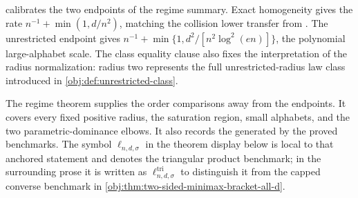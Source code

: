 \documentclass[11pt]{article}
\begin{document}
 calibrates the two endpoints of the regime summary. Exact homogeneity gives the rate \(n^{-1}+\min(1,d/n^2)\), matching the collision lower transfer from \citet{ZengBalakrishnanHanKennedy2024}. The unrestricted endpoint gives \(n^{-1}+\min\{1,d^2/[n^2\log^2(en)]\}\), the polynomial large-alphabet scale. The class equality clause also fixes the interpretation of the radius normalization: radius two represents the full unrestricted-radius law class introduced in \cref{obj:def:unrestricted-class}.

The regime theorem supplies the order comparisons away from the endpoints. It covers every fixed positive radius, the saturation region, small alphabets, and the two parametric-dominance elbows. It also records the  generated by the proved benchmarks.
The symbol \(\ell_{n,d,\sigma}\) in the theorem display below is local to that anchored statement and denotes the triangular product benchmark; in the surrounding prose it is written as \(\ell^{\mathrm{tri}}_{n,d,\sigma}\) to distinguish it from the capped converse benchmark in \cref{obj:thm:two-sided-minimax-bracket-all-d}.
\end{document}
